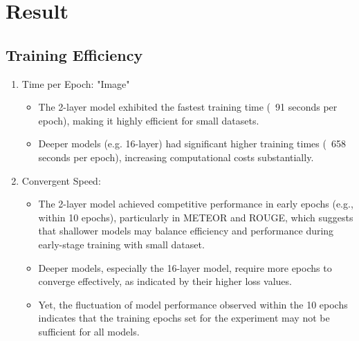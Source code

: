 \documentclass[11pt]{article}
\begin{document}
\section{Result}
\subsection{Training Efficiency}
    \begin{enumerate}
        \item Time per Epoch:
        "Image"
        \begin{itemize}
            \item The 2-layer model exhibited the fastest training time (~91 seconds per epoch), making it highly efficient for small datasets.
            \item Deeper models (e.g. 16-layer) had significant higher training times (~658 seconds per epoch), increasing computational costs substantially.
        \end{itemize}

        \item Convergent Speed:
        \begin{itemize}
            \item The 2-layer model achieved competitive performance in early epochs (e.g., within 10 epochs), particularly in METEOR and ROUGE, which suggests that shallower models may balance efficiency and performance during early-stage training with small dataset.
            \item Deeper models, especially the 16-layer model, require more epochs to converge effectively, as indicated by their higher loss values.
            \item Yet, the fluctuation of model performance observed within the 10 epochs indicates that the training epochs set for the experiment may not be sufficient for all models.
        \end{itemize}
    \end{enumerate}
\end{document}
